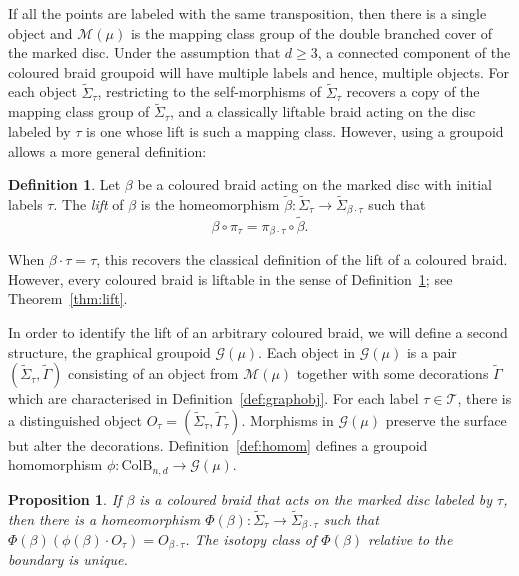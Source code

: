 \documentclass{amsart}
\newtheorem{proposition}[theorem]{Proposition}
\theoremstyle{definition}
\newtheorem{definition}[theorem]{Definition}
\def\ws{\widetilde{\Sigma}}
\begin{document}
If all the points are labeled with the same transposition, then there is a single object and $\mathcal{M}(\mu)$ is the mapping class group of the double branched cover of the marked disc.  Under the assumption that $d\geq 3$, a connected component of the coloured braid groupoid will have multiple labels and hence, multiple objects.   For each object $\ws_\tau$, restricting to the self-morphisms of $\ws_\tau$ recovers a copy of the mapping class group of $\ws_\tau$, and a classically liftable braid acting on the disc labeled by $\tau$ is one whose lift is such a mapping class.  However, using a groupoid allows a more general definition:

\begin{definition}\label{def:genlift} Let $\beta$ be a coloured braid acting on the marked disc with initial labels $\tau$.  The \textit{lift} of $\beta$ is the homeomorphism $\widetilde{\beta}: \ws_{\tau}\rightarrow \ws_{\beta\cdot \tau}$ such that \[\beta\circ \pi_\tau=\pi_{\beta\cdot \tau}\circ \widetilde{\beta}.\]
\end{definition}

When $\beta\cdot \tau=\tau$, this recovers the classical definition of the lift of a coloured braid.  However, every coloured braid is liftable in the sense of Definition~\ref{def:genlift}; see Theorem~\ref{thm:lift}.  

In order to identify the lift of an arbitrary coloured braid, we will define a second structure, the graphical groupoid $\mathcal{G}(\mu)$.  Each object in $\mathcal{G}(\mu)$ is a pair $(\ws_\tau, \widetilde{\Gamma})$ consisting of an object from $\mathcal{M}(\mu)$ together with some decorations $\widetilde{\Gamma}$ which are characterised in Definition~\ref{def:graphobj}.  For each label $\tau\in \mathcal{T}$, there is a distinguished object $O_\tau=(\ws_\tau, \widetilde{\Gamma}_\tau)$. Morphisms in $\mathcal{G}(\mu)$ preserve the surface but alter the decorations. 
Definition~\ref{def:homom} defines a groupoid homomorphism $\phi: \text{ColB}_{n,d}\rightarrow \mathcal{G}(\mu)$. 

 
\begin{proposition}\label{prop:label} If $\beta$ is a coloured braid that acts on the marked disc labeled by $\tau$, then there is a homeomorphism $\Phi(\beta)\colon\widetilde{\Sigma}_\tau\to \widetilde{\Sigma}_{\beta\cdot\tau}$ such that $\Phi(\beta)(\phi(\beta) \cdot O_\tau)=O_{\beta\cdot \tau}$. The isotopy class of $\Phi(\beta)$ relative to the boundary is unique.
\end{proposition}
\end{document}
